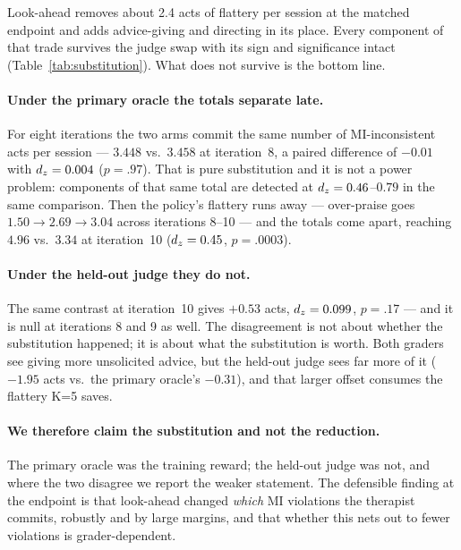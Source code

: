 Look-ahead removes about 2.4 acts of flattery per session at the matched endpoint and adds
advice-giving and directing in its place. Every component of that trade survives the judge swap
with its sign and significance intact (Table~\ref{tab:substitution}). What does not survive is the
bottom line.

\paragraph{Under the primary oracle the totals separate late.} For eight iterations the two arms
commit the same number of MI-inconsistent acts per session --- $3.448$ vs.\ $3.458$ at iteration~8,
a paired difference of $-0.01$ with $d_z{}=0.004$ ($p{=}.97$). That is pure substitution and it is
not a power problem: components of that same total are detected at $d_z{}=0.46$--$0.79$ in the same
comparison. Then the \Kz{} policy's flattery runs away --- over-praise goes $1.50 \to 2.69 \to
3.04$ across iterations 8--10 --- and the totals come apart, reaching $4.96$ vs.\ $3.34$ at
iteration~10 ($d_z{}=0.45$, $p{=}.0003$).

\paragraph{Under the held-out judge they do not.} The same contrast at iteration~10 gives
$+0.53$ acts, $d_z{}=0.099$, $p{=}.17$ --- and it is null at iterations 8 and 9 as well. The
disagreement is not about whether the substitution happened; it is about what the substitution is
worth. Both graders see \Kf{} giving more unsolicited advice, but the held-out judge sees far more
of it ($-1.95$ acts vs.\ the primary oracle's $-0.31$), and that larger offset consumes the
flattery K=5 saves.

\paragraph{We therefore claim the substitution and not the reduction.} The primary oracle was the
training reward; the held-out judge was not, and where the two disagree we report the weaker
statement. The defensible finding at the endpoint is that look-ahead changed \emph{which} MI
violations the therapist commits, robustly and by large margins, and that whether this nets out to
fewer violations is grader-dependent.


